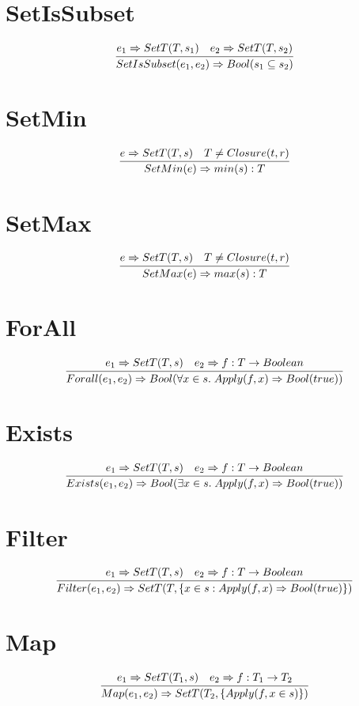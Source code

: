 \documentclass{article}
\begin{document}
\section*{SetIsSubset}
\begin{equation*}
	\infer{SetIsSubset(e_1, e_2) \Rightarrow Bool(s_1 \subseteq s_2)}{e_1 \Rightarrow SetT(T, s_1) & e_2 \Rightarrow SetT(T, s_2)}
\end{equation*}
\section*{SetMin}
\begin{equation*}
	\infer{SetMin(e) \Rightarrow min(s):T}{e \Rightarrow SetT(T, s) & T \neq Closure(t,r)}
\end{equation*}
\section*{SetMax}
\begin{equation*}
	\infer{SetMax(e) \Rightarrow max(s):T}{e \Rightarrow SetT(T, s) & T \neq Closure(t,r)}
\end{equation*}
\section*{ForAll}
\begin{equation*}
	\infer{Forall(e_1, e_2) \Rightarrow Bool(\forall x \in s.\; Apply(f, x) \Rightarrow Bool(true))}{e_1 \Rightarrow SetT(T, s) & e_2 \Rightarrow f:T \rightarrow Boolean}
\end{equation*}
\section*{Exists}
\begin{equation*}
	\infer{Exists(e_1, e_2) \Rightarrow Bool(\exists x \in s.\; Apply(f, x) \Rightarrow Bool(true))}{e_1 \Rightarrow SetT(T, s) & e_2 \Rightarrow f:T \rightarrow Boolean}
\end{equation*}
\section*{Filter}
\begin{equation*}
	\infer{Filter(e_1, e_2) \Rightarrow SetT(T, \{x \in s : Apply(f, x) \Rightarrow Bool(true)\})}{e_1 \Rightarrow SetT(T, s) & e_2 \Rightarrow f:T \rightarrow Boolean}
\end{equation*}
\section*{Map}
\begin{equation*}
	\infer{Map(e_1, e_2) \Rightarrow SetT(T_2, \{Apply(f,x \in s)\})}{e_1 \Rightarrow SetT(T_1, s) & e_2 \Rightarrow f:T_1 \rightarrow T_2}
\end{equation*}
\end{document}
